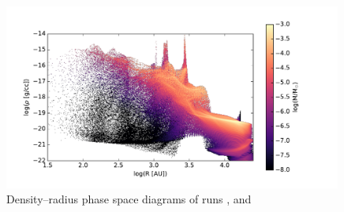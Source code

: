 \begin{figure}[!htb]
 \includegraphics[width=0.99\textwidth]{Figures/var_rt_larson_plots/rho_R_hist_n1c1}
 \captionsetup{justification=justified,singlelinecheck=false,width=\linewidth}
 \decoRule
 \caption[ $\rho$--R phase diagrams]{Density--radius phase space diagrams of runs ,  and }
\label{fig:c1.0_r_R_larson}
\end{figure}
\FloatBarrier

